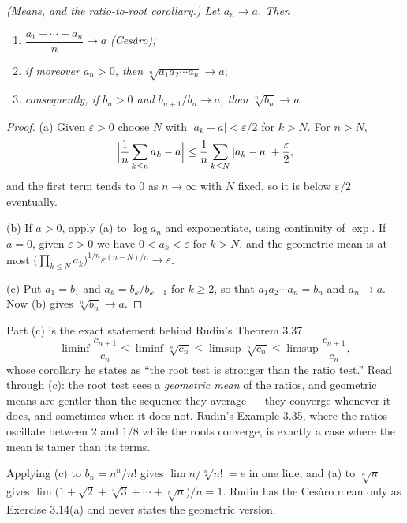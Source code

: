 \emph{(Means, and the ratio-to-root corollary.) Let $a_n \to a$. Then}
\begin{enumerate}[label=(\alph*), leftmargin=2.2em, itemsep=2pt, topsep=3pt]
  \item $\dfrac{a_1+\cdots+a_n}{n} \to a$ \emph{(Ces\`aro);}
  \item \emph{if moreover $a_n > 0$, then}
        $\sqrt[n]{a_1a_2\cdots a_n} \to a$;
  \item \emph{consequently, if $b_n>0$ and $b_{n+1}/b_n \to a$, then}
        $\sqrt[n]{b_n} \to a$.
\end{enumerate}
\begin{proof}
(a) Given $\varepsilon>0$ choose $N$ with $|a_k - a| < \varepsilon/2$ for
$k>N$. For $n>N$,
\[ \Bigl|\frac{1}{n}\sum_{k\le n}a_k - a\Bigr|
   \le \frac{1}{n}\sum_{k \le N}|a_k-a| + \frac{\varepsilon}{2}, \]
and the first term tends to $0$ as $n\to\infty$ with $N$ fixed, so it is
below $\varepsilon/2$ eventually.

(b) If $a>0$, apply (a) to $\log a_n$ and exponentiate, using continuity of
$\exp$. If $a=0$, given $\varepsilon>0$ we have $0<a_k<\varepsilon$ for
$k>N$, and the geometric mean is at most
$\bigl(\prod_{k\le N}a_k\bigr)^{1/n}\varepsilon^{(n-N)/n} \to \varepsilon$.

(c) Put $a_1 = b_1$ and $a_k = b_k/b_{k-1}$ for $k \ge 2$, so that
$a_1a_2\cdots a_n = b_n$ and $a_n \to a$. Now (b) gives
$\sqrt[n]{b_n} \to a$.
\end{proof}

\begin{deeper}
Part (c) is the exact statement behind Rudin's Theorem 3.37,
\[ \liminf \frac{c_{n+1}}{c_n} \le \liminf \sqrt[n]{c_n}
   \le \limsup \sqrt[n]{c_n} \le \limsup \frac{c_{n+1}}{c_n}, \]
whose corollary he states as ``the root test is stronger than the ratio
test.'' Read through (c): the root test sees a \emph{geometric mean} of the
ratios, and geometric means are gentler than the sequence they average ---
they converge whenever it does, and sometimes when it does not. Rudin's
Example 3.35, where the ratios oscillate between $2$ and $1/8$ while the
roots converge, is exactly a case where the mean is tamer than its terms.

Applying (c) to $b_n = n^n/n!$ gives $\lim n/\sqrt[n]{n!} = e$ in one line,
and (a) to $\sqrt[n]{n}$ gives
$\lim \bigl(1+\sqrt2+\sqrt[3]{3}+\cdots+\sqrt[n]{n}\bigr)/n = 1$. Rudin has
the Ces\`aro mean only as Exercise 3.14(a) and never states the geometric
version.
\end{deeper}

